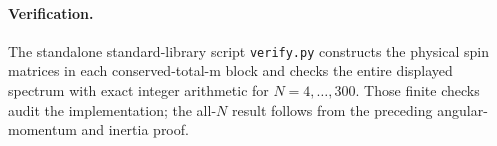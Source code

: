 \documentclass[11pt]{article}
\begin{document}
\paragraph{Verification.}
The standalone standard-library script \texttt{verify.py} constructs the
physical spin matrices in each conserved-total-m block and checks the
entire displayed spectrum with exact integer arithmetic for $N=4,\ldots,300$.
Those finite checks audit the implementation; the all-$N$ result follows
from the preceding angular-momentum and inertia proof.
\end{document}
